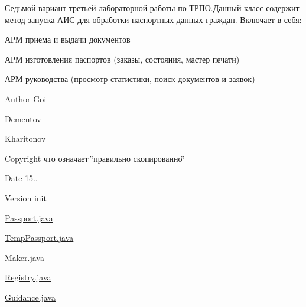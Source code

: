 Седьмой вариант третьей лабораторной работы по ТРПО.\+Данный класс содержит метод запуска АИС для обработки паспортных данных граждан. Включает в себя\+:
\begin{DoxyItemize}
\item АРМ приема и выдачи документов
\item АРМ изготовления паспортов (заказы, состояния, мастер печати)
\item АРМ руководства (просмотр статистики, поиск документов и заявок) \begin{DoxyAuthor}{Author}
Goi 

Dementov 

Kharitonov 
\end{DoxyAuthor}
\begin{DoxyCopyright}{Copyright}
что означает \char`\"{}правильно скопированно\char`\"{} 
\end{DoxyCopyright}
\begin{DoxyDate}{Date}
15.. 
\end{DoxyDate}
\begin{DoxyVersion}{Version}
init
\end{DoxyVersion}

\item \mbox{\hyperlink{Passport_8java}{Passport.\+java}}
\item \mbox{\hyperlink{TempPassport_8java}{Temp\+Passport.\+java}}
\item \mbox{\hyperlink{Maker_8java}{Maker.\+java}}
\item \mbox{\hyperlink{Registry_8java}{Registry.\+java}}
\item \mbox{\hyperlink{Guidance_8java}{Guidance.\+java}} 
\end{DoxyItemize}